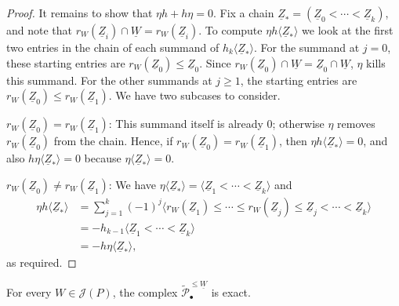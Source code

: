 \documentclass[a4paper,leqno]{amsart}
\begin{document}
{\begin{proof}
It remains to show that $\eta h+h\eta=0$.
Fix a chain $\underline{Z}_\ast=(\underline{Z}_0<\cdots<\underline{Z}_k)$, and note that $r_W(\underline{Z}_i)\cap\underline{W}=r_W(\underline{Z}_i)$. 
To compute $\eta h\langle\underline{Z}_\ast\rangle$ we look at the first two entries in the chain of each summand of $h_k\langle\underline{Z}_\ast\rangle$. 
For the summand at $j=0$, these starting entries are $r_W(\underline{Z}_0)\le \underline{Z}_0$.  Since $r_W(\underline{Z}_0)\cap \underline{W} = \underline{Z}_0\cap\underline{W}$,  $\eta$ kills this summand. 
For the other summands at $j\geq1$, the starting entries are $r_W(\underline{Z}_0)\le r_W(\underline{Z}_1)$.  We have two subcases to consider.

\underline{$r_W(\underline{Z}_0)=r_W(\underline{Z}_1)$}: This summand itself is already $0$; otherwise $\eta$ removes $r_W(\underline{Z}_0)$ from the chain. 
Hence, if $r_W(\underline{Z}_0)=r_W(\underline{Z}_1)$, then $\eta h\langle\underline{Z}_\ast\rangle=0$, and also $h\eta\langle\underline{Z}_\ast\rangle=0$ because $\eta\langle\underline{Z}_\ast\rangle=0$. 

\underline{$r_W(\underline{Z}_0)\neq r_W(\underline{Z}_1)$}: We have $\eta\langle\underline{Z}_\ast\rangle=\langle\underline{Z}_1<\cdots<\underline{Z}_k\rangle$ and
\begin{align*}
 \eta h\langle\underline{Z}_\ast\rangle
 &=\sum_{j=1}^k(-1)^j
 \langle r_W(\underline{Z}_1)\leq\cdots\leq r_W(\underline{Z}_j)\leq\underline{Z}_j<\cdots<\underline{Z}_k\rangle\\
 &=-h_{k-1}\langle\underline{Z}_1<\cdots<\underline{Z}_k\rangle\\
 &=-h\eta\langle\underline{Z}_\ast\rangle,
\end{align*}
as required.
\end{proof}
}


\begin{prop}\label{prop:lower-subcomplex-exact}
For every $W\in\mathcal J(P)$, the complex $\widetilde{\mathcal P}_\bullet^{\leq \underline{W}}$ is exact.
\end{prop}
\end{document}
